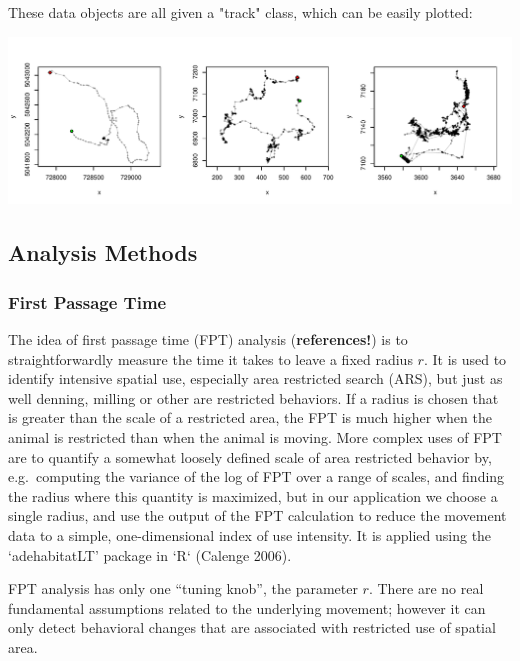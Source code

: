 \documentclass[10pt]{article}\usepackage{graphicx, color}
\newenvironment{knitrout}{}{} %
\begin{document}
These data objects are all given a "track" class, which can be easily plotted:

\begin{knitrout}
\color{fgcolor}
\includegraphics[width=\textwidth]{figure/alltracks} 

\end{knitrout}



\subsection{Analysis Methods}

\subsubsection{First Passage Time}

The idea of first passage time (FPT) analysis ({\bf references!}) is to straightforwardly measure the time it takes to leave a fixed radius $r$. It is used to identify intensive spatial use, especially area restricted search (ARS), but just as well denning, milling or other are restricted behaviors.  If a radius is chosen that is greater than the scale of a restricted area, the FPT is much higher when the animal is restricted than when the animal is moving.  More complex uses of FPT are to quantify a somewhat loosely defined scale of area restricted behavior by, e.g.~computing the variance of the log of FPT over a range of scales, and finding the radius where this quantity is maximized, but in our application we choose a single radius, and use the output of the FPT calculation to reduce the movement data to a simple, one-dimensional index of use intensity.  It is applied using the  `adehabitatLT' package in `R` (Calenge 2006).   

FPT analysis has only one ``tuning knob'', the parameter $r$. There are no real fundamental assumptions related to the underlying movement; however it can only detect behavioral changes that are associated with restricted use of spatial area. 
\end{document}
